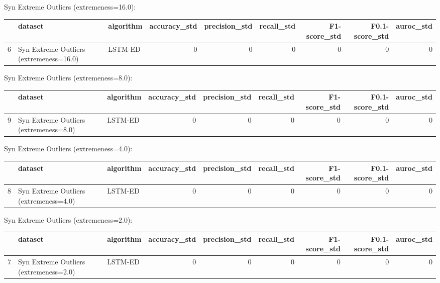 Syn Extreme Outliers (extremeness=16.0):

\begin{tabular}{rllrrrrrr}
\hline
    & dataset                                 & algorithm   &   accuracy\_std &   precision\_std &   recall\_std &   F1-score\_std &   F0.1-score\_std &   auroc\_std \\
\hline
  6 & Syn Extreme Outliers (extremeness=16.0) & LSTM-ED     &              0 &               0 &            0 &              0 &                0 &           0 \\
\hline
\end{tabular}

Syn Extreme Outliers (extremeness=8.0):

\begin{tabular}{rllrrrrrr}
\hline
    & dataset                                & algorithm   &   accuracy\_std &   precision\_std &   recall\_std &   F1-score\_std &   F0.1-score\_std &   auroc\_std \\
\hline
  9 & Syn Extreme Outliers (extremeness=8.0) & LSTM-ED     &              0 &               0 &            0 &              0 &                0 &           0 \\
\hline
\end{tabular}

Syn Extreme Outliers (extremeness=4.0):

\begin{tabular}{rllrrrrrr}
\hline
    & dataset                                & algorithm   &   accuracy\_std &   precision\_std &   recall\_std &   F1-score\_std &   F0.1-score\_std &   auroc\_std \\
\hline
  8 & Syn Extreme Outliers (extremeness=4.0) & LSTM-ED     &              0 &               0 &            0 &              0 &                0 &           0 \\
\hline
\end{tabular}

Syn Extreme Outliers (extremeness=2.0):

\begin{tabular}{rllrrrrrr}
\hline
    & dataset                                & algorithm   &   accuracy\_std &   precision\_std &   recall\_std &   F1-score\_std &   F0.1-score\_std &   auroc\_std \\
\hline
  7 & Syn Extreme Outliers (extremeness=2.0) & LSTM-ED     &              0 &               0 &            0 &              0 &                0 &           0 \\
\hline
\end{tabular}

